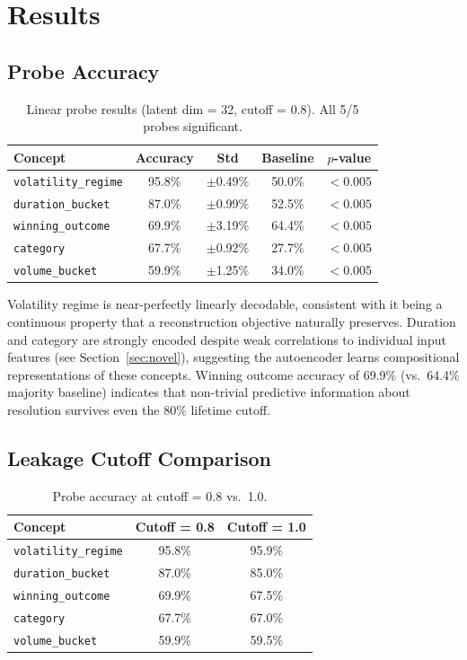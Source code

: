 \documentclass[11pt,a4paper]{article}
\begin{document}
\section{Results}

\subsection{Probe Accuracy}

\begin{table}[H]
\centering
\caption{Linear probe results (latent dim = 32, cutoff = 0.8). All 5/5 probes significant.}
\label{tab:results}
\begin{tabular}{@{}lcccc@{}}
\toprule
\textbf{Concept} & \textbf{Accuracy} & \textbf{Std} & \textbf{Baseline} & \textbf{$p$-value} \\
\midrule
\texttt{volatility\_regime} & 95.8\% & $\pm$0.49\% & 50.0\% & $<0.005$ \\
\texttt{duration\_bucket} & 87.0\% & $\pm$0.99\% & 52.5\% & $<0.005$ \\
\texttt{winning\_outcome} & 69.9\% & $\pm$3.19\% & 64.4\% & $<0.005$ \\
\texttt{category} & 67.7\% & $\pm$0.92\% & 27.7\% & $<0.005$ \\
\texttt{volume\_bucket} & 59.9\% & $\pm$1.25\% & 34.0\% & $<0.005$ \\
\bottomrule
\end{tabular}
\end{table}

Volatility regime is near-perfectly linearly decodable, consistent with it being a continuous property that a reconstruction objective naturally preserves. Duration and category are strongly encoded despite weak correlations to individual input features (see Section~\ref{sec:novel}), suggesting the autoencoder learns compositional representations of these concepts. Winning outcome accuracy of 69.9\% (vs.\ 64.4\% majority baseline) indicates that non-trivial predictive information about resolution survives even the 80\% lifetime cutoff.

\subsection{Leakage Cutoff Comparison}

\begin{table}[H]
\centering
\caption{Probe accuracy at cutoff = 0.8 vs.\ 1.0.}
\label{tab:cutoff}
\begin{tabular}{@{}lcc@{}}
\toprule
\textbf{Concept} & \textbf{Cutoff = 0.8} & \textbf{Cutoff = 1.0} \\
\midrule
\texttt{volatility\_regime} & 95.8\% & 95.9\% \\
\texttt{duration\_bucket} & 87.0\% & 85.0\% \\
\texttt{winning\_outcome} & 69.9\% & 67.5\% \\
\texttt{category} & 67.7\% & 67.0\% \\
\texttt{volume\_bucket} & 59.9\% & 59.5\% \\
\bottomrule
\end{tabular}
\end{table}
\end{document}
